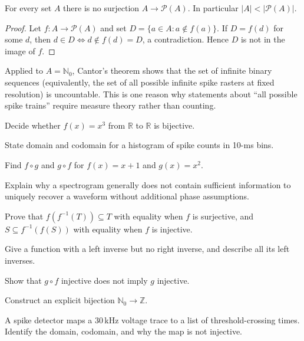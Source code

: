 \begin{theorem}[Cantor]
For every set $A$ there is no surjection $A\to\mathcal P(A)$. In particular $|A|<|\mathcal P(A)|$.
\end{theorem}
\begin{proof}
Let $f:A\to\mathcal P(A)$ and set $D=\{a\in A:a\notin f(a)\}$. If $D=f(d)$ for some $d$, then $d\in D\iff d\notin f(d)=D$, a contradiction. Hence $D$ is not in the image of $f$.
\end{proof}
Applied to $A=\mathbb N_0$, Cantor's theorem shows that the set of infinite binary sequences (equivalently, the set of all possible infinite spike rasters at fixed resolution) is uncountable. This is one reason why statements about ``all possible spike trains'' require measure theory rather than counting.
\begin{exercises}
\item Decide whether $f(x)=x^3$ from $\mathbb R$ to $\mathbb R$ is bijective.
\item State domain and codomain for a histogram of spike counts in 10-ms bins.
\item Find $f\circ g$ and $g\circ f$ for $f(x)=x+1$ and $g(x)=x^2$.
\item Explain why a spectrogram generally does not contain sufficient information to uniquely recover a waveform without additional phase assumptions.
\item Prove that $f(f^{-1}(T))\subseteq T$ with equality when $f$ is surjective, and $S\subseteq f^{-1}(f(S))$ with equality when $f$ is injective.
\item Give a function with a left inverse but no right inverse, and describe all its left inverses.
\item Show that $g\circ f$ injective does not imply $g$ injective.
\item Construct an explicit bijection $\mathbb N_0\to\mathbb Z$.
\item A spike detector maps a 30\,kHz voltage trace to a list of threshold-crossing times. Identify the domain, codomain, and why the map is not injective.
\end{exercises}
